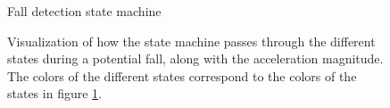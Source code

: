 \documentclass[12pt, a4paper, onecolumn]{article}
\begin{document}
	\begin{figure}[H]
		\centering
		\caption{Fall detection state machine}%
		\label{fig:state-machine}%
	\end{figure}
	
	\begin{figure}[H]
		\centering
		\caption{Visualization of how the state machine passes through the different states during a potential fall, along with the acceleration magnitude. The colors of the different states correspond to the colors of the states in figure \ref{fig:state-machine}.}%
		\label{fig:fall-data-state-machine}%
	\end{figure}
	
\end{document}
